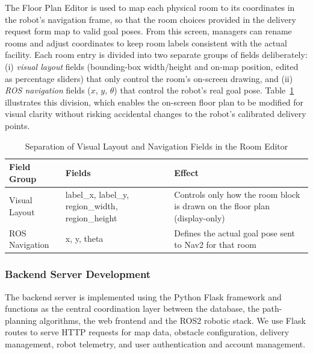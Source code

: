 The Floor Plan Editor is used to map each physical room to its coordinates in the robot’s navigation frame, so that the room choices provided in the delivery request form map to valid goal poses. From this screen, managers can rename rooms and adjust coordinates to keep room labels consistent with the actual facility. Each room entry is divided into two separate groups of fields deliberately: (i) \emph{visual layout} fields (bounding-box width/height and on-map position, edited as percentage sliders) that only control the room's on-screen drawing, and (ii) \emph{ROS navigation} fields ($x$, $y$, $\theta$) that control the robot's real goal pose. Table~\ref{tab:room_fields} illustrates this division, which enables the on-screen floor plan to be modified for visual clarity without risking accidental changes to the robot's calibrated delivery points.
\begin{table}[H]
	\centering
	\caption{Separation of Visual Layout and Navigation Fields in the Room Editor}
	\label{tab:room_fields}
	\begin{tabular}{|p{3.2cm}|p{4.5cm}|p{5.5cm}|}
		\hline
		\textbf{Field Group} & \textbf{Fields} & \textbf{Effect} \\
		\hline
		Visual Layout & label\_x, label\_y, region\_width, region\_height & Controls only how the room block is drawn on the floor plan (display-only) \\
		\hline
		ROS Navigation & x, y, theta & Defines the actual goal pose sent to Nav2 for that room \\
		\hline
	\end{tabular}
\end{table}

\subsubsection{Backend Server Development}

The backend server is implemented using the Python Flask framework and functions as the central coordination layer between the database, the path-planning algorithms, the web frontend and the ROS2 robotic stack. We use Flask routes to serve HTTP requests for map data, obstacle configuration, delivery management, robot telemetry, and user authentication and account management.

